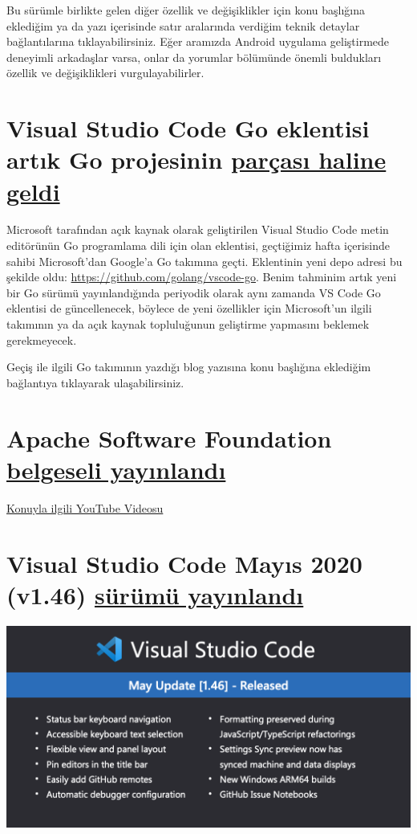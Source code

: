 \documentclass[11pt]{article}
\begin{document}
Bu sürümle birlikte gelen diğer özellik ve değişiklikler için konu başlığına
eklediğim ya da yazı içerisinde satır aralarında verdiğim teknik detaylar
bağlantılarına tıklayabilirsiniz. Eğer aramızda Android uygulama geliştirmede
deneyimli arkadaşlar varsa, onlar da yorumlar bölümünde önemli buldukları
özellik ve değişiklikleri vurgulayabilirler.
\section{Visual Studio Code Go eklentisi artık Go projesinin \href{https://blog.golang.org/vscode-go}{parçası haline geldi}}
\label{sec:org0b430ec}
Microsoft tarafından açık kaynak olarak geliştirilen Visual Studio Code metin
editörünün Go programlama dili için olan eklentisi, geçtiğimiz hafta
içerisinde sahibi Microsoft'dan Google'a Go takımına geçti. Eklentinin yeni
depo adresi bu şekilde oldu: \url{https://github.com/golang/vscode-go}. Benim
tahminim artık yeni bir Go sürümü yayınlandığında periyodik olarak aynı
zamanda VS Code Go eklentisi de güncellenecek, böylece de yeni özellikler için
Microsoft'un ilgili takımının ya da açık kaynak topluluğunun geliştirme
yapmasını beklemek gerekmeyecek.

Geçiş ile ilgili Go takımının yazdığı blog yazısına konu başlığına eklediğim
bağlantıya tıklayarak ulaşabilirsiniz.
\section{Apache Software Foundation \href{https://www.youtube.com/watch?v=JUt2nb0mgwg}{belgeseli yayınlandı}}
\label{sec:org573a40f}
\href{https://www.youtube.com/watch?v=JUt2nb0mgwg}{Konuyla ilgili YouTube Videosu}
\section{Visual Studio Code Mayıs 2020 (v1.46) \href{https://code.visualstudio.com/updates/v1\_46}{sürümü yayınlandı}}
\label{sec:org46ecb52}
\begin{center}
\includegraphics[width=.9\linewidth]{gorseller/vscode-1-46.png}
\end{center}
\end{document}
